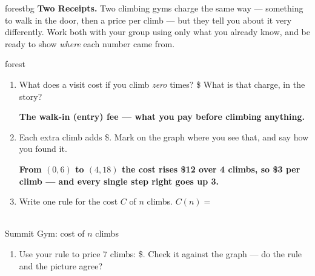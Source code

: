 \documentclass[12pt]{article}
\newcommand{\answerspace}[2]{\par\nopagebreak\noindent\begin{minipage}[t][#1][t]{\linewidth}%
  \color{keyred}\bfseries #2\end{minipage}\par}
\newcommand{\gymgrid}{%
  \draw[xstep=1, ystep=3, linegray!40, very thin] (0,0) grid (8,30);
  \draw[->, semithick, charcoal] (0,0)--(8.7,0) node[right, font=\scriptsize]{$n$};
  \draw[->, semithick, charcoal] (0,0)--(0,32) node[above, font=\scriptsize]{$C$ (\$)};
  \foreach \x in {2,4,6,8} \node[charcoal, font=\tiny, below] at (\x,0){\x};
  \foreach \y in {6,12,18,24,30} \node[charcoal, font=\tiny, left] at (0,\y){\y};}
\begin{document}

\vspace{0.06in}

\begin{headlinebox}{forestbg}
\textbf{Two Receipts.} Two climbing gyms charge the same way --- something to walk in the door, then a
price per climb --- but they tell you about it very differently. Work both with your group using only
what you already know, and be ready to show \emph{where} each number came from.
\end{headlinebox}

\vspace{0.04in}

\begin{scenariobox}{forest}
\begin{minipage}[t]{0.54\linewidth}
\vspace{0pt}
\begin{enumerate}[label=\textbf{\alph*.}, leftmargin=1.8em, itemsep=4pt]
  \item What does a visit cost if you climb \emph{zero} times? \$ \;
        What is that charge, in the story?
        \answerspace{1.2cm}{The walk-in (entry) fee --- what you pay before climbing anything.}
  \item Each extra climb adds \$. Mark on the graph where you see that, and say how
        you found it.
        \answerspace{1.4cm}{From $(0,6)$ to $(4,18)$ the cost rises \$12 over 4 climbs, so \$3 per climb --- and every single step right goes up 3.}
  \item Write one rule for the cost $C$ of $n$ climbs. \; $C(n) = $ 
\end{enumerate}
\end{minipage}\hfill
\begin{minipage}[t]{0.42\linewidth}
\vspace{0pt}\centering
{}\\[1pt]
{\footnotesize Summit Gym: cost of $n$ climbs}
\end{minipage}

\begin{enumerate}[label=\textbf{\alph*.}, start=4, leftmargin=1.8em, itemsep=4pt]
  \item Use your rule to price 7 climbs: \$. Check it against the graph --- do the
        rule and the picture agree? 
\end{enumerate}
\end{scenariobox}
\end{document}
